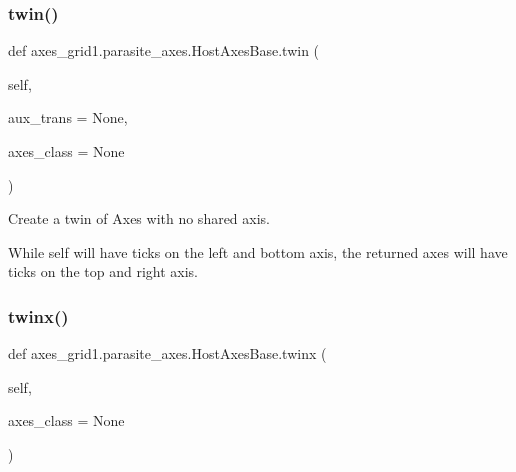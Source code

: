 \mbox{\label{classaxes__grid1_1_1parasite__axes_1_1HostAxesBase_a470c7ca267b185d6e160147ad6cccbca}} 
\subsubsection{\texorpdfstring{twin()}{twin()}}
{\footnotesize\ttfamily def axes\+\_\+grid1.\+parasite\+\_\+axes.\+Host\+Axes\+Base.\+twin (\begin{DoxyParamCaption}\item[{}]{self,  }\item[{}]{aux\+\_\+trans = {\ttfamily None},  }\item[{}]{axes\+\_\+class = {\ttfamily None} }\end{DoxyParamCaption})}

\begin{DoxyVerb}Create a twin of Axes with no shared axis.

While self will have ticks on the left and bottom axis, the returned
axes will have ticks on the top and right axis.
\end{DoxyVerb}
 \mbox{\label{classaxes__grid1_1_1parasite__axes_1_1HostAxesBase_a07479258b634124dcdaf0276b3fbcb37}} 
\subsubsection{\texorpdfstring{twinx()}{twinx()}}
{\footnotesize\ttfamily def axes\+\_\+grid1.\+parasite\+\_\+axes.\+Host\+Axes\+Base.\+twinx (\begin{DoxyParamCaption}\item[{}]{self,  }\item[{}]{axes\+\_\+class = {\ttfamily None} }\end{DoxyParamCaption})}

